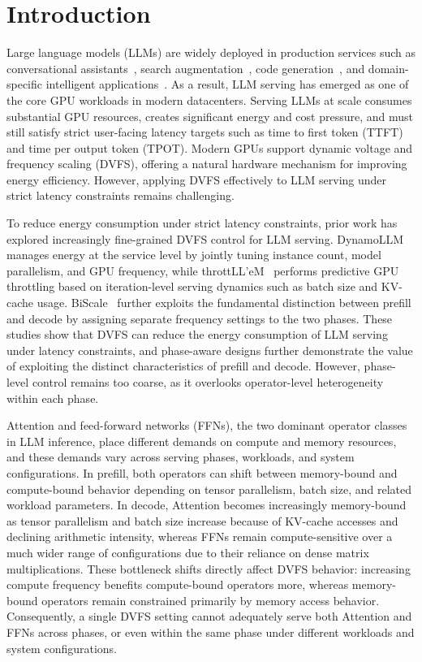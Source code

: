 \section{Introduction}
\label{sec:introduction}

Large language models (LLMs) are widely deployed in production services such as conversational assistants~\cite{XX}, search augmentation~\cite{XX}, code generation~\cite{XX}, and domain-specific intelligent applications~\cite{XX}. As a result, LLM serving has emerged as one of the core GPU workloads in modern datacenters. Serving LLMs at scale consumes substantial GPU resources, creates significant energy and cost pressure, and must still satisfy strict user-facing latency targets such as time to first token (TTFT) and time per output token (TPOT). Modern GPUs support dynamic voltage and frequency scaling (DVFS), offering a natural hardware mechanism for improving energy efficiency. However, applying DVFS effectively to LLM serving under strict latency constraints remains challenging. 

To reduce energy consumption under strict latency constraints, prior work has explored increasingly fine-grained DVFS control for LLM serving.
%
DynamoLLM~\cite{XX} manages energy at the service level by jointly tuning instance count, model parallelism, and GPU frequency, while throttLL’eM~\cite{XX} performs predictive GPU throttling based on iteration-level serving dynamics such as batch size and KV-cache usage. BiScale~\cite{XX} further exploits the fundamental distinction between prefill and decode by assigning separate frequency settings to the two phases. These studies show that DVFS can reduce the energy consumption of LLM serving under latency constraints, and phase-aware designs further demonstrate the value of exploiting the distinct characteristics of prefill and decode. However, phase-level control remains too coarse, as it overlooks operator-level heterogeneity within each phase.

Attention and feed-forward networks (FFNs), the two dominant operator classes in LLM inference, place different demands on compute and memory resources, and these demands vary across serving phases, workloads, and system configurations. In prefill, both operators can shift between memory-bound and compute-bound behavior depending on tensor parallelism, batch size, and related workload parameters. In decode, Attention becomes increasingly memory-bound as tensor parallelism and batch size increase because of KV-cache accesses and declining arithmetic intensity, whereas FFNs remain compute-sensitive over a much wider range of configurations due to their reliance on dense matrix multiplications. These bottleneck shifts directly affect DVFS behavior: increasing compute frequency benefits compute-bound operators more, whereas memory-bound operators remain constrained primarily by memory access behavior. Consequently, a single DVFS setting cannot adequately serve both Attention and FFNs across phases, or even within the same phase under different workloads and system configurations.

